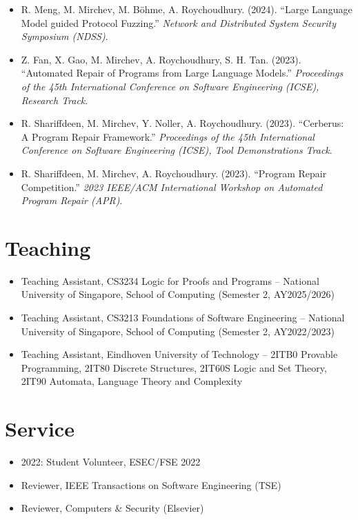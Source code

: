 \documentclass[10pt,a4paper]{article}
\begin{document}
\begin{itemize}[leftmargin=1.1em]
  \item R. Meng, M. Mirchev, M. B\"ohme, A. Roychoudhury. (2024). ``Large Language Model guided Protocol Fuzzing.'' \textit{Network and Distributed System Security Symposium (NDSS)}.
  \item Z. Fan, X. Gao, M. Mirchev, A. Roychoudhury, S. H. Tan. (2023). ``Automated Repair of Programs from Large Language Models.'' \textit{Proceedings of the 45th International Conference on Software Engineering (ICSE), Research Track}.
  \item R. Shariffdeen, M. Mirchev, Y. Noller, A. Roychoudhury. (2023). ``Cerberus: A Program Repair Framework.'' \textit{Proceedings of the 45th International Conference on Software Engineering (ICSE), Tool Demonstrations Track}.
  \item R. Shariffdeen, M. Mirchev, A. Roychoudhury. (2023). ``Program Repair Competition.'' \textit{2023 IEEE/ACM International Workshop on Automated Program Repair (APR)}.
\end{itemize}

\section*{Teaching}
\begin{itemize}
  \item Teaching Assistant, CS3234 Logic for Proofs and Programs -- National University of Singapore, School of Computing (Semester 2, AY2025/2026)
  \item Teaching Assistant, CS3213 Foundations of Software Engineering -- National University of Singapore, School of Computing (Semester 2, AY2022/2023)
  \item Teaching Assistant, Eindhoven University of Technology -- 2ITB0 Provable Programming, 2IT80 Discrete Structures, 2IT60S Logic and Set Theory, 2IT90 Automata, Language Theory and Complexity
\end{itemize}

\section*{Service}
\begin{itemize}
  \item 2022: Student Volunteer, ESEC/FSE 2022
  \item Reviewer, IEEE Transactions on Software Engineering (TSE)
  \item Reviewer, Computers \& Security (Elsevier)
\end{itemize}
\end{document}
